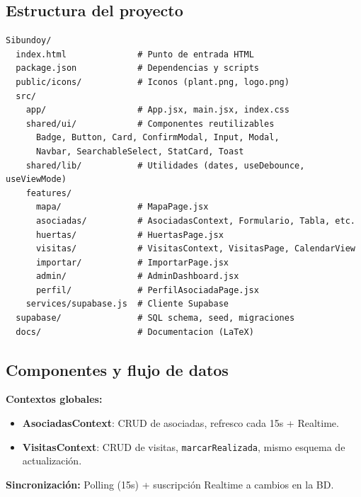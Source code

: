 \documentclass[12pt]{article}
\begin{document}
\subsection{Estructura del proyecto}
\begin{lstlisting}[style=bashstyle]
Sibundoy/
  index.html              # Punto de entrada HTML
  package.json            # Dependencias y scripts
  public/icons/           # Iconos (plant.png, logo.png)
  src/
    app/                  # App.jsx, main.jsx, index.css
    shared/ui/            # Componentes reutilizables
      Badge, Button, Card, ConfirmModal, Input, Modal,
      Navbar, SearchableSelect, StatCard, Toast
    shared/lib/           # Utilidades (dates, useDebounce, useViewMode)
    features/
      mapa/               # MapaPage.jsx
      asociadas/          # AsociadasContext, Formulario, Tabla, etc.
      huertas/            # HuertasPage.jsx
      visitas/            # VisitasContext, VisitasPage, CalendarView
      importar/           # ImportarPage.jsx
      admin/              # AdminDashboard.jsx
      perfil/             # PerfilAsociadaPage.jsx
    services/supabase.js  # Cliente Supabase
  supabase/               # SQL schema, seed, migraciones
  docs/                   # Documentacion (LaTeX)
\end{lstlisting}

\subsection{Componentes y flujo de datos}

\textbf{Contextos globales:}
\begin{itemize}[nosep]
  \item \textbf{AsociadasContext}: CRUD de asociadas, refresco cada 15s + Realtime.
  \item \textbf{VisitasContext}: CRUD de visitas, \texttt{marcarRealizada}, mismo esquema de actualizaci\'on.
\end{itemize}

\textbf{Sincronizaci\'on:} Polling (15s) + suscripci\'on Realtime a cambios en la BD.
\end{document}

